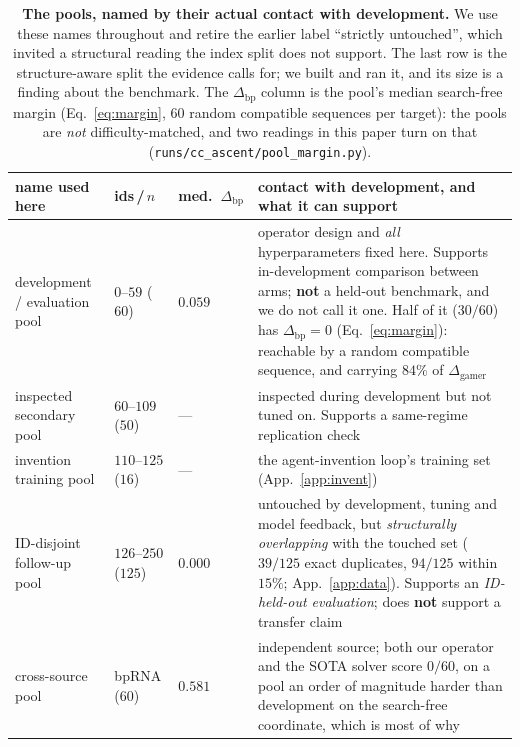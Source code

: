 \documentclass[11pt]{article}
\begin{document}
\begin{table}[t]\centering\small
\setlength{\tabcolsep}{4.5pt}\renewcommand{\arraystretch}{1.15}
\caption{\textbf{The pools, named by their actual contact with development.} We use these names throughout and
retire the earlier label ``strictly untouched'', which invited a structural reading the index split does not
support. The last row is the structure-aware split the evidence calls for; we built and ran it, and its size is a finding about the benchmark. The $\Delta_{\mathrm{bp}}$ column is the pool's median
search-free margin (Eq.~\eqref{eq:margin}, $60$ random compatible sequences per target): the pools are
\emph{not} difficulty-matched, and two readings in this paper turn on that
(\texttt{runs/cc\_ascent/pool\_margin.py}).}\label{tab:pools}
\begin{tabularx}{\linewidth}{@{}>{\raggedright\arraybackslash}p{2.7cm}>{\raggedright\arraybackslash}p{1.3cm}>{\centering\arraybackslash}p{1.15cm}L@{}}
\toprule
\textbf{name used here} & \textbf{ids\,/\,$n$} & \textbf{med.\ $\Delta_{\mathrm{bp}}$} &
\textbf{contact with development, and what it can support}\\
\midrule
development / evaluation pool & $0$--$59$ ($60$) & $0.059$ & operator design and \emph{all} hyperparameters fixed here.
Supports in-development comparison between arms; \textbf{not} a held-out benchmark, and we do not call it one.
Half of it ($30/60$) has $\Delta_{\mathrm{bp}}{=}0$ (Eq.~\eqref{eq:margin}): reachable by a random compatible
sequence, and carrying $84\%$ of $\Delta_{\mathrm{gamer}}$\\
inspected secondary pool & $60$--$109$ ($50$) & --- & inspected during development but not tuned on. Supports a
same-regime replication check\\
invention training pool & $110$--$125$ ($16$) & --- & the agent-invention loop's training set (App.~\ref{app:invent})\\
ID-disjoint follow-up pool & $126$--$250$ ($125$) & $0.000$ & untouched by development, tuning and model feedback, but
\emph{structurally overlapping} with the touched set ($39/125$ exact duplicates, $94/125$ within $15\%$;
App.~\ref{app:data}). Supports an \emph{ID-held-out evaluation}; does \textbf{not} support a transfer claim\\
cross-source pool & bpRNA ($60$) & $\mathbf{0.581}$ & independent source; both our operator and the SOTA
solver score $0/60$, on a pool an order of magnitude harder than development on the search-free
coordinate, which is most of why\\

\end{tabularx}
\end{table}
\end{document}
